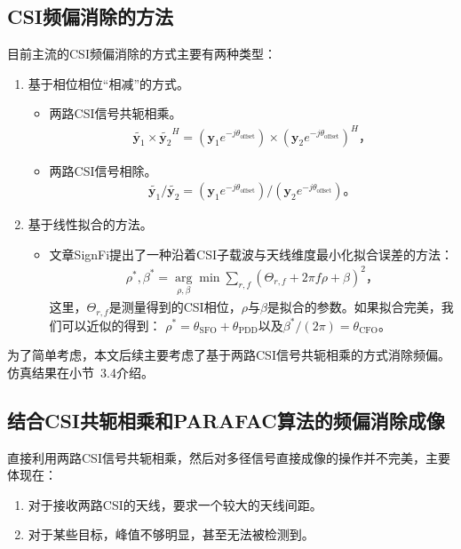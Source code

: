 \subsection{CSI频偏消除的方法}
目前主流的CSI频偏消除的方式主要有两种类型\cite{ma2019wifi}：
\begin{enumerate}
  \item 基于相位相位``相减''的方式\cite{wu2021wifi}。
  \begin{itemize}
    \item 两路CSI信号共轭相乘。
    \begin{align}
      \tilde{\boldsymbol{y}_1}\times\tilde{\boldsymbol{y}_2}^H = (\boldsymbol{y}_1e^{-j\theta_{\text{offset}}})\times(\boldsymbol{y}_2e^{-j\theta_{\text{offset}}})^H
      \text{，}
    \end{align}
    \item 两路CSI信号相除。
    \begin{align}
      \tilde{\boldsymbol{y}_1}/\tilde{\boldsymbol{y}_2} = (\boldsymbol{y}_1e^{-j\theta_{\text{offset}}})/(\boldsymbol{y}_2e^{-j\theta_{\text{offset}}})
      \text{。}
    \end{align}
  \end{itemize}
  \item 基于线性拟合的方法。
  \begin{itemize}
    \item 文章SignFi\cite{SignFi}提出了一种沿着CSI子载波与天线维度最小化拟合误差的方法：
    \begin{align}
      \rho^*, \beta^* = \arg \limits_{\rho,\beta} \min \sum_{r,f}(\Theta_{r,f} + 2\pi f \rho + \beta)^2
      \text{，}
    \end{align}
    这里，$\Theta_{r,f}$是测量得到的CSI相位，$\rho$与$\beta$是拟合的参数。如果拟合完美，我们可以近似的得到：
    $\rho^* = \theta_{\text{SFO}} + \theta_{\text{PDD}}$以及$\beta^*/(2\pi) = \theta_{\text{CFO}}$。
  \end{itemize}
\end{enumerate}


为了简单考虑，本文后续主要考虑了基于两路CSI信号共轭相乘的方式消除频偏。仿真结果在小节~3.4介绍。
\subsection{结合CSI共轭相乘和PARAFAC算法的频偏消除成像}
直接利用两路CSI信号共轭相乘，然后对多径信号直接成像的操作并不完美，主要体现在：
\begin{enumerate}
  \item 对于接收两路CSI的天线，要求一个较大的天线间距。
  \item 对于某些目标，峰值不够明显，甚至无法被检测到。
\end{enumerate}

